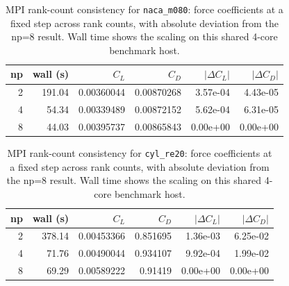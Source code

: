 \begin{table}[H]\centering\small
\begin{tabular}{rrrrrr}\toprule
np & wall (s) & $C_L$ & $C_D$ & $|\Delta C_L|$ & $|\Delta C_D|$ \\
\midrule
2 & 191.04 & 0.00360044 & 0.00870268 & 3.57e-04 & 4.43e-05 \\
4 & 54.34 & 0.00339489 & 0.00872152 & 5.62e-04 & 6.31e-05 \\
8 & 44.03 & 0.00395737 & 0.00865843 & 0.00e+00 & 0.00e+00 \\
\bottomrule\end{tabular}
\caption{MPI rank-count consistency for \texttt{naca\_m080}: force coefficients at a fixed step across rank counts, with absolute deviation from the np=8 result. Wall time shows the scaling on this shared 4-core benchmark host.}
\end{table}

\begin{table}[H]\centering\small
\begin{tabular}{rrrrrr}\toprule
np & wall (s) & $C_L$ & $C_D$ & $|\Delta C_L|$ & $|\Delta C_D|$ \\
\midrule
2 & 378.14 & 0.00453366 & 0.851695 & 1.36e-03 & 6.25e-02 \\
4 & 71.76 & 0.00490044 & 0.934107 & 9.92e-04 & 1.99e-02 \\
8 & 69.29 & 0.00589222 & 0.91419 & 0.00e+00 & 0.00e+00 \\
\bottomrule\end{tabular}
\caption{MPI rank-count consistency for \texttt{cyl\_re20}: force coefficients at a fixed step across rank counts, with absolute deviation from the np=8 result. Wall time shows the scaling on this shared 4-core benchmark host.}
\end{table}